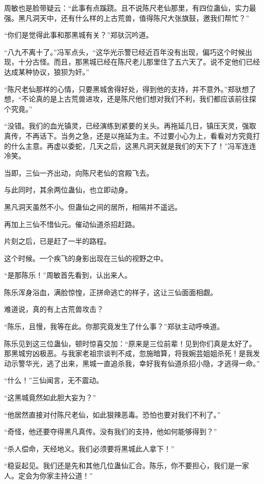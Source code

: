\begin{this_body}
周敏也是脸带疑云：“此事有点蹊跷。且不说陈尺老仙那里，有四位蛊仙，实力最强。黑凡洞天中，还有什么样的上古荒兽，值得陈尺大张旗鼓，邀我们帮忙？”

“你们是觉得此事和那黑城有关？”郑驮沉吟道。

“八九不离十了。”冯军点头，“这华光示警已经近百年没有出现，偏巧这个时候出现，十分古怪。而且，那黑城已经在陈尺老儿那里住了五六天了。说不定他们已经达成某种协议，狼狈为奸。”

“陈尺老仙那样的心情，只要黑城舍得好处，得到他的支持，并不意外。”郑驮想了想，“不论真的是上古荒兽进攻，还是陈尺他们想对我们不利，我们都应该前往探个究竟。”

“没错。我们的血光镇灵，已经演练到紧要的关头。再拖延几日，镇压天灵，强取真传，不再话下。当务之急，还是以拖延为主。不过要小心为上，看看对方究竟打的什么主意。再虚以委蛇，几天之后，这黑凡洞天就是我们的天下了！”冯军连连冷笑。

当即，三仙一齐出动，向陈尺老仙的宫殿飞去。

与此同时，其余两位蛊仙，也立即动身。

黑凡洞天虽然不小。但蛊仙之间的居所，相隔并不遥远。

再加上三仙不惜仙元。催动仙道杀招赶路。

片刻之后，已是赶了一半的路程。

这个时候。一个疾飞的身影出现在三仙的视野之中。

“是那陈乐！”周敏首先看到，认出来人。

陈乐浑身浴血，满脸惊惶，正拼命逃亡的样子，这让三仙面面相觑。

难道说，真的有上古荒兽攻击？

“陈乐，且慢，我等在此。你那究竟发生了什么事？”郑驮主动呼唤道。

陈乐见到这三位蛊仙，顿时惊喜交加：“原来是三位前辈！见到你们真是太好了。那黑城穷凶极恶。与我家老祖宗谈判不成，忽施暗算，将我婉芸姐姐杀死！是我发动示警华光，逃了出来，黑城一直追杀我，幸好我有仙道杀招小隐，才逃得一命。”

“什么！”三仙闻言，无不震动。

“这黑城竟然如此胆大妄为？”

“他居然直接对付陈尺老仙，如此狠辣恶毒。恐怕也要对我们不利了。”

“奇怪，他还要夺得黑凡真传。没有我们的支持，他如何能够得到？”

“杀人偿命，天经地义。我们必须要将黑城此人拿下！”

“稳妥起见。我们还是先和其他几位蛊仙汇合。陈乐，你不要担心，我们是一家人。定会为你家主持公道！”


\end{this_body}

